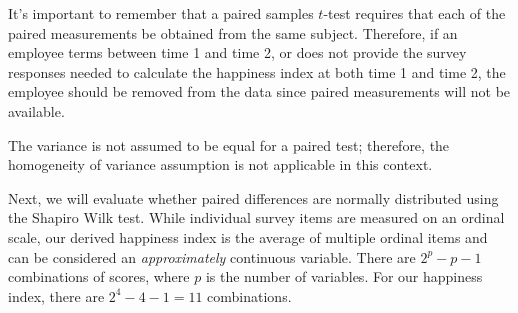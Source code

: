 \documentclass[
]{book}
\begin{document}
It's important to remember that a paired samples \(t\)-test requires that each of the paired measurements be obtained from the same subject. Therefore, if an employee terms between time 1 and time 2, or does not provide the survey responses needed to calculate the happiness index at both time 1 and time 2, the employee should be removed from the data since paired measurements will not be available.

The variance is not assumed to be equal for a paired test; therefore, the homogeneity of variance assumption is not applicable in this context.

Next, we will evaluate whether paired differences are normally distributed using the Shapiro Wilk test. While individual survey items are measured on an ordinal scale, our derived happiness index is the average of multiple ordinal items and can be considered an \emph{approximately} continuous variable. There are \(2^p - p - 1\) combinations of scores, where \(p\) is the number of variables. For our happiness index, there are \(2^4 - 4 - 1 = 11\) combinations.
\end{document}
